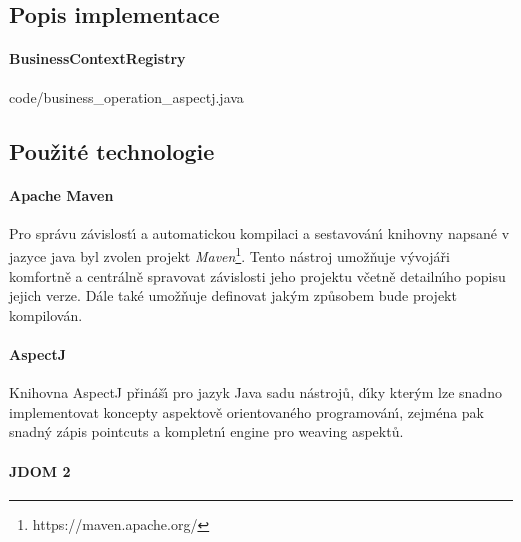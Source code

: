 \subsection{Popis implementace}

\paragraph{BusinessContextRegistry}


{code/business_operation_aspectj.java}

\subsection{Použité technologie}

\paragraph{Apache Maven}

Pro správu závislost\'{\i} a automatickou kompilaci a sestavován\'{\i}
knihovny napsané v jazyce java byl zvolen projekt
\textit{Maven}\footnote{https://maven.apache.org/}.
Tento nástroj umožňuje v\'yvojáři komfortně a centrálně
spravovat závislosti jeho projektu včetně detailn\'{\i}ho
popisu jejich verze. Dále také umožňuje definovat jak\'ym
způsobem bude projekt kompilován.

\paragraph{AspectJ}

Knihovna AspectJ přináš\'{\i} pro jazyk Java sadu nástrojů,
d\'{\i}ky kter\'ym lze snadno implementovat koncepty aspektově orientovaného
programován\'{\i}, zejména pak snadn\'y zápis pointcuts a kompletn\'{\i}
engine pro weaving aspektů.


\paragraph{JDOM 2}

